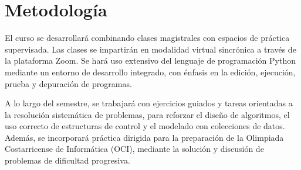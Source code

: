 \section{Metodología}

El curso se desarrollará combinando clases magistrales con espacios de práctica supervisada.
Las clases se impartirán en modalidad virtual sincrónica a través de la plataforma Zoom.
Se hará uso extensivo del lenguaje de programación Python mediante un entorno de desarrollo integrado, con énfasis en la edición, ejecución, prueba y depuración de programas.

A lo largo del semestre, se trabajará con ejercicios guiados y tareas orientadas a la resolución sistemática de problemas, para reforzar el diseño de algoritmos, el uso correcto de estructuras de control y el modelado con colecciones de datos.
Además, se incorporará práctica dirigida para la preparación de la Olimpiada Costarricense de Informática (OCI), mediante la solución y discusión de problemas de dificultad progresiva.

